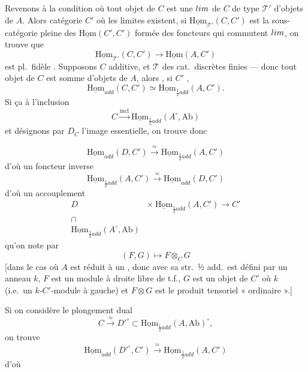 \documentclass[11pt,a4paper]{article}
\begin{document}
Revenons à la condition où tout objet de $C$ est une $\varinjlim$ de $C$ de type $\mathcal{T}'$ d'objets de $A$.
Alors  \ill{} catégorie $C'$ où les limites existent, si
$\underline{\mathrm{Hom}}_{\mathcal{T}'}(C, C')$ est la sous-catégorie pleine des
$\underline{\mathrm{Hom}}(C', C')$ formée des foncteurs qui commutent  $\varinjlim$, on
trouve que
\[
\underline{\mathrm{Hom}}_{\mathcal{T}'}(C, C') \longrightarrow \underline{\mathrm{Hom}}(A, C')
\]
est pl.\ fidèle .
Supposons $C$ additive, et $\mathcal{T}$  des cat.\ discrètes finies — donc tout objet de $C$
est somme d'objets de $A$, alors , si $C'$ ,
\[
\underline{\mathrm{Hom}}_{add}(C, C') \simeq \underline{\mathrm{Hom}}_{\frac{1}{2}add}(A, C') .
\]
Si  ça à l'inclusion
\[
C \xrightarrow{\text{incl}} \underline{\mathrm{Hom}}_{\frac{1}{2}add}(A^{\circ}, \mathrm{Ab})
\]
et désignons par $D_C$ l'image essentielle, on trouve donc

\[
\underline{\mathrm{Hom}}_{add}(D, C') \xrightarrow{\ \approx\ } \underline{\mathrm{Hom}}_{\frac{1}{2}add}(A, C')
\]
d'où un foncteur inverse
\[
\underline{\mathrm{Hom}}_{\frac{1}{2}add}(A, C') \xrightarrow{\ \approx\ } \underline{\mathrm{Hom}}_{add}(D, C')
\]
d'où un accouplement
\[
\begin{array}{cl}
D & \times\ \underline{\mathrm{Hom}}_{\frac{1}{2}add}(A, C') \longrightarrow C' \\
\cap & \\
\underline{\mathrm{Hom}}_{\frac{1}{2}add}(A^{\circ}, \mathrm{Ab}) &
\end{array}
\]
qu'on note par 
\[
(F, G) \longmapsto F \otimes_{C} G
\]
[dans le cas où $A$ est réduit à un , donc avec sa str.\ ½ add.\ est défini par un anneau $k$,
$F$ est un module à droite libre de t.f., $G$ est un objet de $C'$ où $k$  (i.e.\ un
$k$-$C'$-module à gauche) et $F \otimes G$ est le produit tensoriel « ordinaire ».]

Si on considère  le plongement dual
\[
C \xrightarrow{\ \approx\ } D'^{\circ} \subset \underline{\mathrm{Hom}}_{\frac{1}{2}add}(A, \mathrm{Ab})^{\circ} ,
\]
on trouve
\[
\underline{\mathrm{Hom}}_{add}(D'^{\circ}, C') \xrightarrow{\ \approx\ } \underline{\mathrm{Hom}}_{\frac{1}{2}add}(A, C')
\]
d'où
\end{document}
